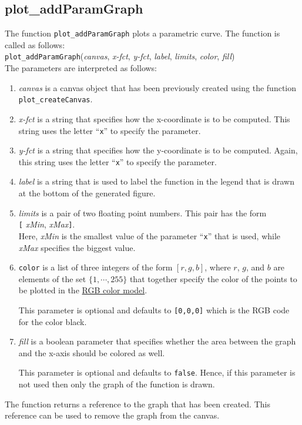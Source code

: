 \subsection{plot\_addParamGraph}
The function \texttt{plot\_addParamGraph} plots a parametric curve.  The function is called as
follows:
\\[0.2cm]
\hspace*{1.3cm}
\texttt{plot\_addParamGraph}(\textsl{canvas}, \textsl{x-fct}, \textsl{y-fct}, \textsl{label}, \textsl{limits}, \textsl{color}, \textsl{fill})
\\[0.2cm]
The parameters are interpreted as follows:
\begin{enumerate}
\item \textsl{canvas} is a canvas object that has been previously created using the function
       \texttt{plot\_createCanvas}.  
\item \textsl{x-fct} is a string that specifies how the x-coordinate is to be computed.
      This string uses the letter ``\texttt{x}'' to specify the parameter.
\item \textsl{y-fct} is a string that specifies how the y-coordinate is to be computed.
      Again, this string uses the letter ``\texttt{x}'' to specify the parameter.
\item \textsl{label} is a string that is used to label the function in the legend that is drawn at
      the bottom of the generated figure.
\item \textsl{limits} is a pair of two floating point numbers.  This pair has the form
      \\[0.2cm]
      \hspace*{1.3cm}
      \texttt{[} \textsl{xMin}, \textsl{xMax}\texttt{]}.
      \\[0.2cm]
      Here, \textsl{xMin} is the smallest value of the parameter ``\texttt{x}'' that is used, while
      \textsl{xMax} specifies the biggest value.
\item \texttt{color} is a list of three integers of the form $[r,g,b]$, where $r$, $g$, and $b$ are
      elements of the set $\{1, \cdots, 255\}$ that together specify the color of the points
      to be plotted in the \href{https://en.wikipedia.org/wiki/RGB_color_model}{RGB color model}.

      This parameter is optional and defaults to \texttt{[0,0,0]} which is the RGB code for the
      color black.
\item \textsl{fill} is a boolean parameter that specifies whether the area between the graph and the
      x-axis should be colored as well.  

      This parameter is optional and defaults to \texttt{false}.  Hence, if this
      parameter is not used then only the graph of the function is drawn.
\end{enumerate}
The function returns a reference to the graph that has been created.  This reference can be used
to remove the graph from the canvas.

